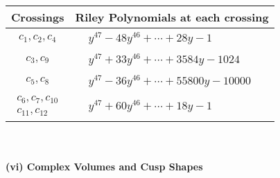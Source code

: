 \documentclass[1p]{elsarticle_modified}
\theoremstyle{definition}
\begin{document}
\begin{tabular}{m{50pt}|m{274pt}}
Crossings & \hspace{64pt}Riley Polynomials at each crossing \\
\hline $$\begin{aligned}c_{1},c_{2},c_{4}\end{aligned}$$&$\begin{aligned}
&y^{47}-48 y^{46}+\cdots+28 y-1
\end{aligned}$\\
\hline $$\begin{aligned}c_{3},c_{9}\end{aligned}$$&$\begin{aligned}
&y^{47}+33 y^{46}+\cdots+3584 y-1024
\end{aligned}$\\
\hline $$\begin{aligned}c_{5},c_{8}\end{aligned}$$&$\begin{aligned}
&y^{47}-36 y^{46}+\cdots+55800 y-10000
\end{aligned}$\\
\hline $$\begin{aligned}c_{6},c_{7},c_{10}\\c_{11},c_{12}\end{aligned}$$&$\begin{aligned}
&y^{47}+60 y^{46}+\cdots+18 y-1
\end{aligned}$\\
\hline
\end{tabular}\\~\\
\newpage\flushleft \textbf{(vi) Complex Volumes and Cusp Shapes}
\end{document}
